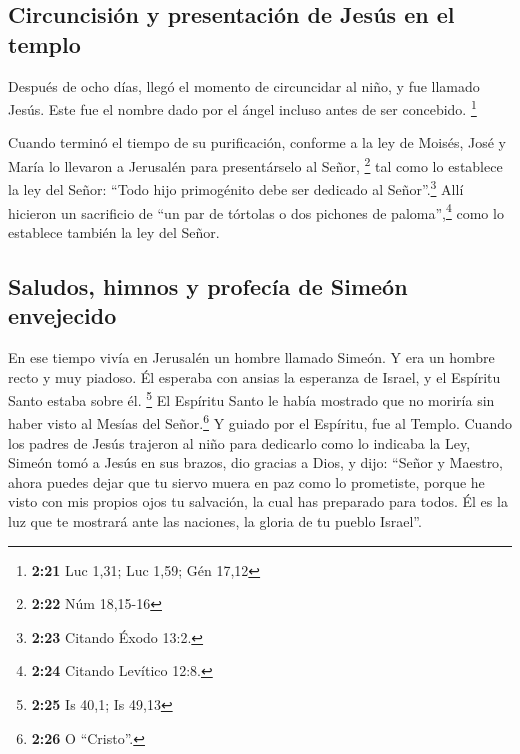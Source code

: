 \hypertarget{circuncisiuxf3n-y-presentaciuxf3n-de-jesuxfas-en-el-templo}{%
\subsection{Circuncisión y presentación de Jesús en el
templo}\label{circuncisiuxf3n-y-presentaciuxf3n-de-jesuxfas-en-el-templo}}

 Después de ocho días, llegó el momento de circuncidar al
niño, y fue llamado Jesús. Este fue el nombre dado por el ángel incluso
antes de ser concebido. \footnote{\textbf{2:21} Luc 1,31; Luc 1,59; Gén
  17,12}

 Cuando terminó el tiempo de su purificación, conforme a
la ley de Moisés, José y María lo llevaron a Jerusalén para
presentárselo al Señor, \footnote{\textbf{2:22} Núm 18,15-16}
 tal como lo establece la ley del Señor: ``Todo hijo
primogénito debe ser dedicado al Señor''.\footnote{\textbf{2:23} Citando
  Éxodo 13:2.}  Allí hicieron un sacrificio de ``un par
de tórtolas o dos pichones de paloma'',\footnote{\textbf{2:24} Citando
  Levítico 12:8.} como lo establece también la ley del Señor.

\hypertarget{saludos-himnos-y-profecuxeda-de-simeuxf3n-envejecido}{%
\subsection{Saludos, himnos y profecía de Simeón
envejecido}\label{saludos-himnos-y-profecuxeda-de-simeuxf3n-envejecido}}

 En ese tiempo vivía en Jerusalén un hombre llamado
Simeón. Y era un hombre recto y muy piadoso. Él esperaba con ansias la
esperanza de Israel, y el Espíritu Santo estaba sobre él. \footnote{\textbf{2:25}
  Is 40,1; Is 49,13}  El Espíritu Santo le había mostrado
que no moriría sin haber visto al Mesías del Señor.\footnote{\textbf{2:26}
  O ``Cristo''.}  Y guiado por el Espíritu, fue al
Templo. Cuando los padres de Jesús trajeron al niño para dedicarlo como
lo indicaba la Ley,  Simeón tomó a Jesús en sus brazos,
dio gracias a Dios, y dijo:  ``Señor y Maestro, ahora
puedes dejar que tu siervo muera en paz como lo prometiste,
 porque he visto con mis propios ojos tu salvación,
 la cual has preparado para todos.  Él es
la luz que te mostrará ante las naciones, la gloria de tu pueblo
Israel''.

